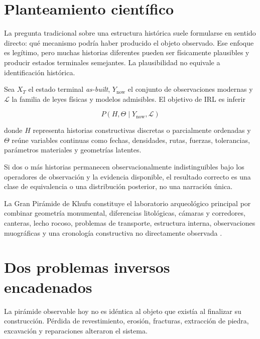 
\section{Planteamiento científico}

La pregunta tradicional sobre una estructura histórica suele formularse en sentido directo: qué mecanismo podría haber producido el objeto observado. Ese enfoque es legítimo, pero muchas historias diferentes pueden ser físicamente plausibles y producir estados terminales semejantes. La plausibilidad no equivale a identificación histórica.

Sea \(X_T\) el estado terminal \emph{as-built}, \(Y_{\mathrm{now}}\) el conjunto de observaciones modernas y \(\mathcal L\) la familia de leyes físicas y modelos admisibles. El objetivo de IRL es inferir

\begin{equation}
\boxed{
P(H,\Theta\mid Y_{\mathrm{now}},\mathcal L)
}
\end{equation}

donde \(H\) representa historias constructivas discretas o parcialmente ordenadas y \(\Theta\) reúne variables continuas como fechas, densidades, rutas, fuerzas, tolerancias, parámetros materiales y geometrías latentes.

\begin{principle}
Si dos o más historias permanecen observacionalmente indistinguibles bajo los operadores de observación y la evidencia disponible, el resultado correcto es una clase de equivalencia o una distribución posterior, no una narración única.
\end{principle}

La Gran Pirámide de Khufu constituye el laboratorio arqueológico principal por combinar geometría monumental, diferencias litológicas, cámaras y corredores, canteras, lecho rocoso, problemas de transporte, estructura interna, observaciones muográficas y una cronología constructiva no directamente observada \cite{petrie1883,arnold1991,lehner1997,morishima2017,procureur2023,aeraquarry,ghoneim2024}.

\section{Dos problemas inversos encadenados}

La pirámide observable hoy no es idéntica al objeto que existía al finalizar su construcción. Pérdida de revestimiento, erosión, fracturas, extracción de piedra, excavación y reparaciones alteraron el sistema.

